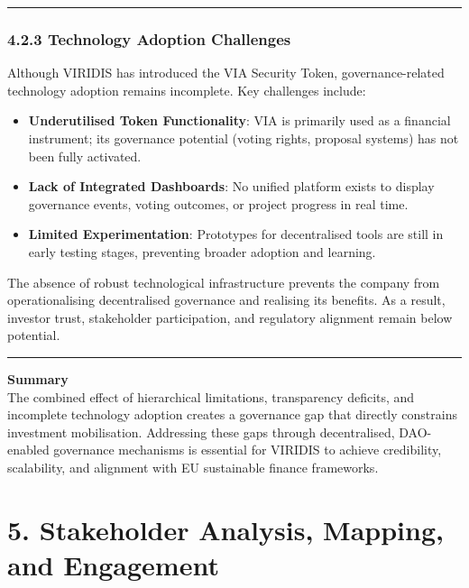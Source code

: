 \documentclass[
  english,
  12pt,
  oneside,
  open=any]{scrbook}
\providecommand{\tightlist}{%
  \setlength{\itemsep}{0pt}\setlength{\parskip}{0pt}}\usepackage{longtable,booktabs,array}
\begin{document}
\begin{center}\rule{0.5\linewidth}{0.5pt}\end{center}

\subsection{4.2.3 Technology Adoption Challenges}\label{sec-tech-chal}

Although VIRIDIS has introduced the VIA Security Token,
governance-related technology adoption remains incomplete. Key
challenges include:

\begin{itemize}
\tightlist
\item
  \textbf{Underutilised Token Functionality}: VIA is primarily used as a
  financial instrument; its governance potential (voting rights,
  proposal systems) has not been fully activated.\\
\item
  \textbf{Lack of Integrated Dashboards}: No unified platform exists to
  display governance events, voting outcomes, or project progress in
  real time.\\
\item
  \textbf{Limited Experimentation}: Prototypes for decentralised tools
  are still in early testing stages, preventing broader adoption and
  learning.
\end{itemize}

The absence of robust technological infrastructure prevents the company
from operationalising decentralised governance and realising its
benefits. As a result, investor trust, stakeholder participation, and
regulatory alignment remain below potential.

\begin{center}\rule{0.5\linewidth}{0.5pt}\end{center}

\textbf{Summary}\\
The combined effect of hierarchical limitations, transparency deficits,
and incomplete technology adoption creates a governance gap that
directly constrains investment mobilisation. Addressing these gaps
through decentralised, DAO-enabled governance mechanisms is essential
for VIRIDIS to achieve credibility, scalability, and alignment with EU
sustainable finance frameworks.

\chapter{5. Stakeholder Analysis, Mapping, and
Engagement}\label{sec-engagement}
\end{document}
